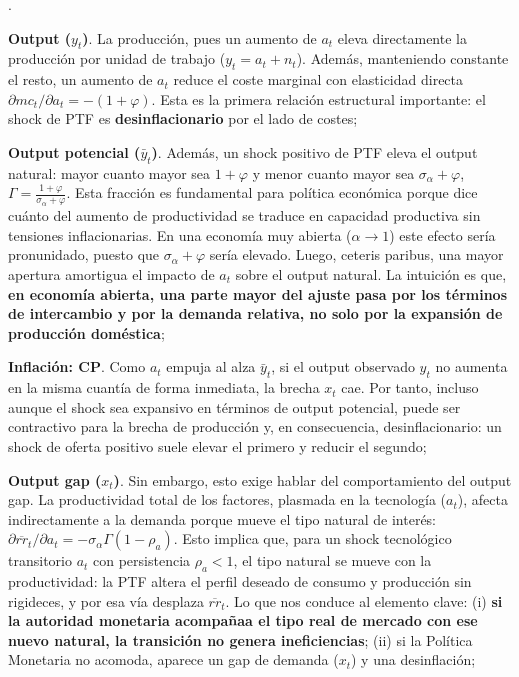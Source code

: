 \documentclass[10pt,a4paper]{article}
\newcounter{numitem}
\newenvironment{lnum}
      {\begin{list}{\arabic{numitem}.}{%
          \usecounter{numitem}%
          \setlength{\leftmargin}{1cm}%
          \setlength{\parskip}{3pt}%
          \setlength{\itemsep}{0pt}%
          \setlength{\parsep}{0pt}%
      }}
      {\end{list}}
\begin{document}
\begin{lnum}
    \item \textbf{Output ($y_t$)}. La producción, pues un aumento de $a_t$ eleva directamente la producción por unidad de trabajo ($y_t=a_t+n_t$). Además, manteniendo constante el resto, un aumento de $a_t$ reduce el coste marginal con elasticidad directa $\partial mc_t/\partial a_t=-(1+\varphi)$. Esta es la primera relación estructural importante: el shock de PTF es \textbf{desinflacionario} por el lado de costes;
    \item \textbf{Output potencial ($\bar y_t$)}. Además, un shock positivo de PTF eleva el output natural: mayor cuanto mayor sea $1+\varphi$ y menor cuanto mayor sea $\sigma_\alpha+\varphi$, $\Gamma=\frac{1+\varphi}{\sigma_\alpha+\varphi}$. Esta fracción es fundamental para política económica porque dice cuánto del aumento de productividad se traduce en capacidad productiva sin tensiones inflacionarias. En una economía muy abierta ($\alpha\to1$) este efecto sería pronunidado, puesto que $\sigma_\alpha+\varphi$ sería elevado. Luego, ceteris paribus, una mayor apertura amortigua el impacto de $a_t$ sobre el output natural. La intuición es que, \textbf{en economía abierta, una parte mayor del ajuste pasa por los términos de intercambio y por la demanda relativa, no solo por la expansión de producción doméstica};
    \item \textbf{Inflación: CP}. Como $a_t$ empuja al alza $\bar y_t$, si el output observado $y_t$ no aumenta en la misma cuantía de forma inmediata, la brecha $x_t$ cae. Por tanto, incluso aunque el shock sea expansivo en términos de output potencial, puede ser contractivo para la brecha de producción y, en consecuencia, desinflacionario: un shock de oferta positivo suele elevar el primero y reducir el segundo;
    \item \textbf{Output gap ($x_t$)}. Sin embargo, esto exige hablar del comportamiento del output gap. La productividad total de los factores, plasmada en la tecnología ($a_t$), afecta indirectamente a la demanda porque mueve el tipo natural de interés: $\partial \overline{rr}_t/\partial a_t=-\sigma_\alpha\Gamma(1-\rho_a)$. Esto implica que, para un shock tecnológico transitorio $a_t$ con persistencia $\rho_a<1$, el tipo natural se mueve con la productividad: la PTF altera el perfil deseado de consumo y producción sin rigideces, y por esa vía desplaza $\overline{rr}_t$. Lo que nos conduce al elemento clave: (i) \textbf{si la autoridad monetaria acompañaa el tipo real de mercado con ese nuevo natural, la transición no genera ineficiencias}; (ii) si la Política Monetaria no acomoda, aparece un gap de demanda ($x_t$) y una desinflación;

\end{lnum}
\end{document}
